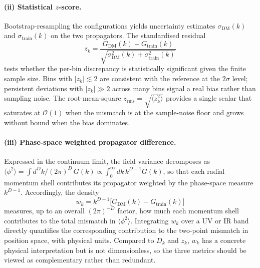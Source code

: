 \paragraph{(ii) Statistical $z$-score.}
Bootstrap-resampling the configurations yields uncertainty estimates $\sigma_{\text{DM}}(k)$ and $\sigma_{\text{train}}(k)$ on the two propagators. The standardised residual
\begin{equation}
z_k = \frac{G_{\text{DM}}(k)-G_{\text{train}}(k)}{\sqrt{\sigma_{\text{DM}}^2(k)+\sigma_{\text{train}}^2(k)}}
\label{eq:prop_zscore}
\end{equation}
tests whether the per-bin discrepancy is statistically significant given the finite sample size. Bins with $|z_k|\lesssim 2$ are consistent with the reference at the $2\sigma$ level; persistent deviations with $|z_k|\gg 2$ across many bins signal a real bias rather than sampling noise. The root-mean-square $z_{\text{rms}}=\sqrt{\langle z_k^2\rangle}$ provides a single scalar that saturates at $\mathcal{O}(1)$ when the mismatch is at the sample-noise floor and grows without bound when the bias dominates.

\paragraph{(iii) Phase-space weighted propagator difference.}
Expressed in the continuum limit, the field variance decomposes as $\langle\phi^2\rangle=\int\! d^Dk/(2\pi)^D\,G(k)\propto\int_0^\infty\! dk\,k^{D-1}G(k)$, so that each radial momentum shell contributes its propagator weighted by the phase-space measure $k^{D-1}$. Accordingly, the density
\begin{equation}
w_k = k^{D-1}\bigl[G_{\text{DM}}(k)-G_{\text{train}}(k)\bigr]
\label{eq:ps_weighted_delta}
\end{equation}
measures, up to an overall $(2\pi)^{-D}$ factor, how much each momentum shell contributes to the total mismatch in $\langle\phi^2\rangle$. Integrating $w_k$ over a UV or IR band directly quantifies the corresponding contribution to the two-point mismatch in position space, with physical units. Compared to $D_k$ and $z_k$, $w_k$ has a concrete physical interpretation but is not dimensionless, so the three metrics should be viewed as complementary rather than redundant.

